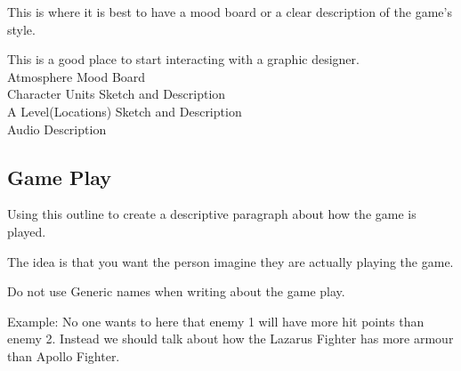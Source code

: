 This is where it is best to have a mood board or a clear description of the game’s style. 

This is a good place to start interacting with a graphic designer.\\

Atmosphere Mood Board\\
Character  Units Sketch and Description\\
A Level(Locations) Sketch and Description\\
Audio Description

\subsection{Game Play}

Using this outline to create a descriptive paragraph about how the game is played. 

The idea is that you want the person imagine they are actually playing the game.

Do not use Generic names when writing about the game play. 

Example: No one wants to here that enemy 1 will have more hit points than enemy 2. Instead we should talk about how the Lazarus Fighter has more armour than Apollo Fighter.

